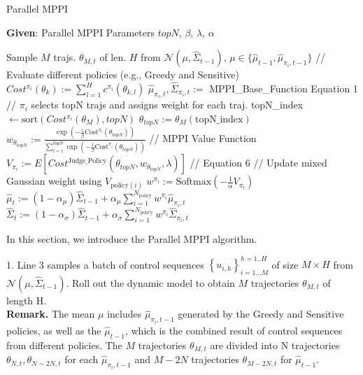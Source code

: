 \documentclass{article}
\begin{document}
\begin{algorithm}
	\caption{Parallel MPPI}
	\begin{algorithmic}[1]
		\State \textbf{Given}: Parallel MPPI Parameters $topN$, $\beta$, $\lambda$, $\alpha$
			
		\State Sample $M$ trajs. $\theta_{M,t}$ of len. $H$ from $\mathcal{N}(\mu, \widehat{\Sigma}_{t-1})$, $\mu \in \{\widehat{\mu}_{t-1}, \widehat{\mu}_{\pi_i,t-1}\}$
		\State \textcolor{lightpurple}{// Evaluate different policies (e.g., Greedy and Sensitive)}
		\State $Cost^{\pi_i}(\theta_k) := \sum_{l=1}^H c^{\pi_i}(\theta_{k,l})$
		\EndFor
		\State $\widehat{\mu}_{\pi_i,t}, \widehat{\Sigma}_{\pi_i,t}:= $ MPPI\_Base\_Function Equation 1
		\State \textcolor{lightpurple}{// $\pi_i$ selects topN trajs and assigns weight for each traj.}
		\State topN\_index $\leftarrow \text{sort}(Cost^{\pi_i}(\theta_M), topN)$ 
		\State $\theta_{topN} := \theta_M(\text{topN\_index})$
		\State $w_{\theta_{topN}} := 
		\frac{\exp\left(-\frac{1}{\beta}\text{Cost}^{\pi_i}(\theta_{topN})\right)}
		{\sum_{l=1}^{topN} \exp\left(-\frac{1}{\beta}\text{Cost}^{\pi_i}(\theta_{topN})\right)}
		$
		\State \textcolor{lightpurple}{// MPPI Value Function}
		\State $V_{\pi_i} := E[Cost^{\text{Judge\_Policy}}(\theta_{topN}, w_{\theta_{topN}},\lambda)]$ \textcolor{lightpurple} {// Equation 6}
		\EndFor
		\State \textcolor{lightpurple}{// Update mixed Gaussian weight using $V_{\text{policy}(i)}$}
		\State $w^{\pi_i} := \text{Softmax}(-\frac{1}{\alpha} V_{\pi_i})$
		\EndFor
		\State $\widehat{\mu}_t := (1 - \alpha_\mu)\widehat{\Sigma}_{t-1} + \alpha_\mu\sum_{i=1}^{N_{\text{policy}}} w^{\pi_i}\widehat{\mu}_{\pi_i,t}$
		\State $\widehat{\Sigma}_t := (1 - \alpha_\sigma)\widehat{\Sigma}_{t-1} + \alpha_\sigma\sum_{i=1}^{N_{\text{policy}}} w^{\pi_i}\widehat{\Sigma}_{\pi_i,t}$

		\EndWhile
	\end{algorithmic}
\end{algorithm}

In this section, we introduce the Parallel MPPI algorithm.

1. Line 3 samples a batch of control sequences \(\left\{u_{i, h}\right\}_{i=1 . . . M}^{h=1 . . H}\) of size \(M \times H\) from  $\mathcal{N}(\mu, \widehat{\Sigma}_{t-1})$. Roll out the dynamic model to obtain $M$ trajectories $\theta_{M,t}$  of length H. \\
\textbf{Remark.} The mean $\mu$ includes $\widehat{\mu}_{\pi_i,t-1}$ generated by the Greedy and Sensitive policies, as well as the $\widehat{\mu}_{t-1}$, which is the combined result of control sequences from different policies. The $M$ trajectories $\theta_{M,t}$ are divided into N trajectories  $\theta_{N,t},\theta_{N\sim 2N,t}$ for each  $\widehat{\mu}_{\pi_i,t-1}$ and $M-2N$ trajectories  $\theta_{M-2N,t}$ for  $\widehat{\mu}_{t-1}$.
\end{document}
